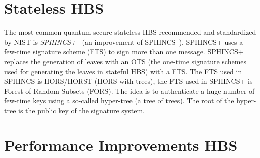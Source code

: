 \section{Stateless HBS}
The most common quantum-secure stateless HBS recommended and standardized by NIST is \textit{SPHINCS+}~\cite{tweakable_basispaper_sphincs_2019} (an improvement of SPHINCS~\cite{sphincs_old_version_2015}).
SPHINCS+ uses a few-time signature scheme (FTS) to sign more than one message.
SPHINCS+ replaces the generation of leaves with an OTS (the one-time signature schemes used for generating the leaves in stateful HBS) with a FTS.
The FTS used in SPHINCS is HORS/HORST (HORS with trees), the FTS used in SPHINCS+ is Forest of Random Subsets (FORS). The idea is to authenticate a huge number of few-time keys using a so-called hyper-tree (a tree of trees). The root of the hyper-tree is the public key of the signature system.
~\cite{tweakable_basispaper_sphincs_2019,sphincs+_submission_nist_round2}

\section{Performance Improvements HBS}










